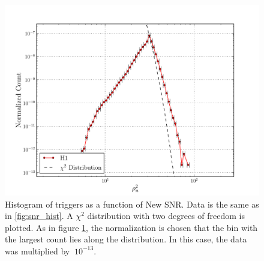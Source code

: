 \begin{figure}
\label{fig:newsnr_hist}
\begin{center}
\includegraphics[width=6in]{figures/H1-newsnr_hist_cat1_veto.pdf}
\end{center}
\caption{Histogram of triggers as a function of New \ac{SNR}. Data is the same as in \ref{fig:snr_hist}. A $\chi^2$ distribution with two degrees of freedom is plotted. As in figure \ref{fig:newsnr_hist}, the normalization is chosen that the bin with the largest count lies along the distribution. In this case, the data was multiplied by $~10^{-13}$.}
\end{figure}

